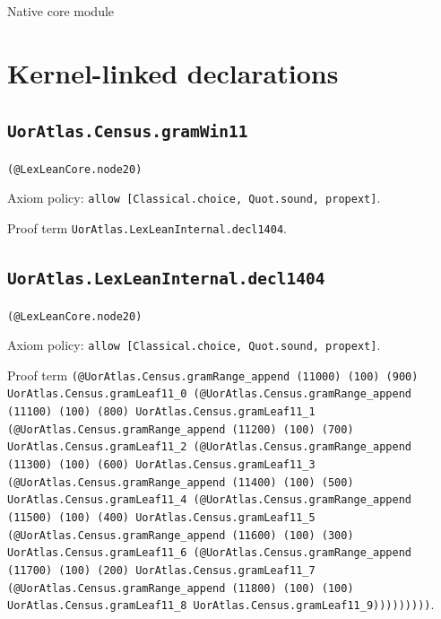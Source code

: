 \documentclass[11pt]{article}
\begin{document}
\begin{center}{\LARGE Native core module}\end{center}
\section*{Kernel-linked declarations}
\subsection*{\texttt{UorAtlas.Census.gramWin11}}
\noindent\texttt{(@LexLeanCore.node20)}\par
\noindent Axiom policy: \texttt{allow [Classical.choice, Quot.sound, propext]}.\par
\noindent Proof term \texttt{UorAtlas.LexLeanInternal.decl1404}.\par
\subsection*{\texttt{UorAtlas.LexLeanInternal.decl1404}}
\noindent\texttt{(@LexLeanCore.node20)}\par
\noindent Axiom policy: \texttt{allow [Classical.choice, Quot.sound, propext]}.\par
\noindent Proof term \texttt{(@UorAtlas.Census.gramRange\_append (11000) (100) (900) UorAtlas.Census.gramLeaf11\_0 (@UorAtlas.Census.gramRange\_append (11100) (100) (800) UorAtlas.Census.gramLeaf11\_1 (@UorAtlas.Census.gramRange\_append (11200) (100) (700) UorAtlas.Census.gramLeaf11\_2 (@UorAtlas.Census.gramRange\_append (11300) (100) (600) UorAtlas.Census.gramLeaf11\_3 (@UorAtlas.Census.gramRange\_append (11400) (100) (500) UorAtlas.Census.gramLeaf11\_4 (@UorAtlas.Census.gramRange\_append (11500) (100) (400) UorAtlas.Census.gramLeaf11\_5 (@UorAtlas.Census.gramRange\_append (11600) (100) (300) UorAtlas.Census.gramLeaf11\_6 (@UorAtlas.Census.gramRange\_append (11700) (100) (200) UorAtlas.Census.gramLeaf11\_7 (@UorAtlas.Census.gramRange\_append (11800) (100) (100) UorAtlas.Census.gramLeaf11\_8 UorAtlas.Census.gramLeaf11\_9)))))))))}.\par
\end{document}
